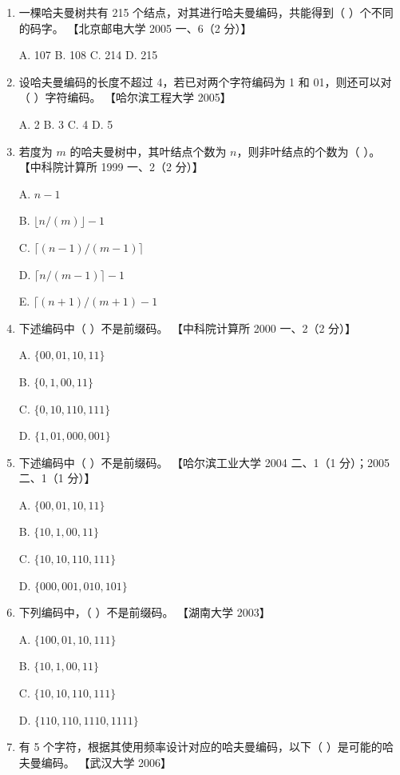 \documentclass[lang=cn,newtx,10pt,scheme=chinese]{elegantbook}
\begin{document}
\begin{enumerate}
    \item 一棵哈夫曼树共有 215 个结点，对其进行哈夫曼编码，共能得到（ ）个不同的码字。  
    【北京邮电大学 2005 一、6（2 分）】  

    A. 107 \quad B. 108 \quad C. 214 \quad D. 215  

    \item 设哈夫曼编码的长度不超过 4，若已对两个字符编码为 1 和 01，则还可以对（ ）字符编码。  
    【哈尔滨工程大学 2005】  

    A. 2 \quad B. 3 \quad C. 4 \quad D. 5  

    \item 若度为 $m$ 的哈夫曼树中，其叶结点个数为 $n$，则非叶结点的个数为（ ）。  
    【中科院计算所 1999 一、2（2 分）】  

    A. $n - 1$ \quad 
    
    B. $\lfloor n / (m) \rfloor - 1$  

    C. $\lceil (n - 1) / (m - 1) \rceil$ \quad 
    
    D. $\lceil n  / (m - 1) \rceil - 1$  

    E. $\lceil(n + 1)/(m + 1)-1$
    \item 下述编码中（ ）不是前缀码。  
    【中科院计算所 2000 一、2（2 分）】  

    A. $\{00, 01, 10, 11\}$  

    B. $\{0, 1, 00, 11\}$  

    C. $\{0, 10, 110, 111\}$  

    D. $\{1, 01, 000, 001\}$  

    \item 下述编码中（ ）不是前缀码。  
    【哈尔滨工业大学 2004 二、1（1 分）；2005 二、1（1 分）】  

    A. $\{00, 01, 10, 11\}$  

    B. $\{10, 1, 00, 11\}$  

    C. $\{10, 10, 110, 111\}$  

    D. $\{000, 001, 010, 101\}$  

    \item 下列编码中，（ ）不是前缀码。  
    【湖南大学 2003】  

    A. $\{100, 01, 10, 111\}$  

    B. $\{10, 1, 00, 11\}$  

    C. $\{10, 10, 110, 111\}$  

    D. $\{110, 110, 1110, 1111\}$  

    \item 有 5 个字符，根据其使用频率设计对应的哈夫曼编码，以下（ ）是可能的哈夫曼编码。  
    【武汉大学 2006】  


\end{enumerate}
\end{document}
